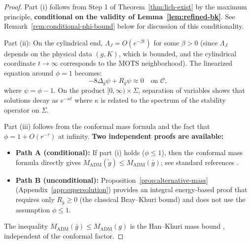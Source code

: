 \documentclass[12pt]{article}
\theoremstyle{plain}
\theoremstyle{definition}
\theoremstyle{remark}
\newcommand{\ADM}{\mathrm{ADM}}
\newcommand{\tg}{\tilde{g}}
\newcommand{\bg}{\bar{g}}
\begin{document}
\begin{proof}
Part (i) follows from Step 1 of Theorem~\ref{thm:lich-exist} by the maximum principle, \textbf{conditional on the validity of Lemma~\ref{lem:refined-bk}}. See Remark~\ref{rem:conditional-phi-bound} below for discussion of this conditionality.

Part (ii): On the cylindrical end, $\Lambda_J = O(e^{-\beta t})$ for some $\beta > 0$ (since $\Lambda_J$ depends on the physical data $(g,K)$, which is bounded, and the cylindrical coordinate $t \to \infty$ corresponds to the MOTS neighborhood). The linearized equation around $\phi = 1$ becomes:
\[
-8\Delta_{\bg}\psi + R_{\bg}\psi \approx 0 \quad \text{on } \mathcal{C},
\]
where $\psi = \phi - 1$. On the product $[0,\infty) \times \Sigma$, separation of variables shows that solutions decay as $e^{-\kappa t}$ where $\kappa$ is related to the spectrum of the stability operator on $\Sigma$.

Part (iii) follows from the conformal mass formula and the fact that $\phi = 1 + O(r^{-\tau})$ at infinity. \textbf{Two independent proofs are available:}
\begin{itemize}
\item \textbf{Path A (conditional):} If part (i) holds ($\phi \leq 1$), then the conformal mass formula directly gives $M_{\ADM}(\tg) \leq M_{\ADM}(\bg)$; see standard references \cite{bartnik1986}.
\item \textbf{Path B (unconditional):} Proposition~\ref{prop:alternative-mass} (Appendix~\ref{app:supersolution}) provides an integral energy-based proof that requires only $R_{\bg} \geq 0$ (the classical Bray--Khuri bound) and does not use the assumption $\phi \leq 1$.
\end{itemize}
The inequality $M_{\ADM}(\bg) \leq M_{\ADM}(g)$ is the Han--Khuri mass bound \cite{hankhuri2013}, independent of the conformal factor.
\end{proof}
\end{document}
